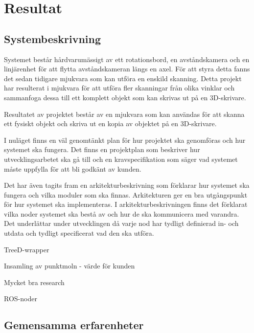 \chapter{Resultat}
\label{cha:results}

\section{Systembeskrivning}

Systemet består hårdvarumässigt av ett rotationsbord, en avståndskamera och en linjärenhet för att flytta avståndskameran längs en axel. För att styra detta fanns det sedan tidigare mjukvara som kan utföra en enskild skanning. Detta projekt har resulterat i mjukvara för att utföra fler skanningar från olika vinklar och sammanfoga dessa till ett komplett objekt som kan skrivas ut på en 3D-skrivare.

Resultatet av projektet består av en mjukvara som kan användas för att skanna ett fysiskt objekt och skriva ut en kopia av objektet på en 3D-skrivare.

I nuläget finns en väl genomtänkt plan för hur projektet ska genomföras och hur systemet ska fungera. Det finns en projektplan som beskriver hur utvecklingsarbetet ska gå till och en kravspecifikation som säger vad systemet måste uppfylla för att bli godkänt av kunden.

Det har även tagits fram en arkitekturbeskrivning som förklarar hur systemet ska fungera och vilka moduler som ska finnas. Arkitekturen ger en bra utgångspunkt för hur systemet ska implementeras. I arkitekturbeskrivningen finns det förklarat vilka noder systemet ska bestå av och hur de ska kommunicera med varandra. Det underlättar under utvecklingen då varje nod har tydligt definierad in- och utdata och tydligt specificerat vad den ska utföra.

TreeD-wrapper

Insamling av punktmoln - värde för kunden

Mycket bra research

ROS-noder




\section{Gemensamma erfarenheter}

